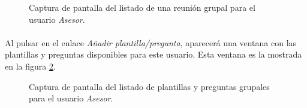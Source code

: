  \begin{figure}[!ht]
    \begin{center}
      \caption{Captura de pantalla del listado de una reunión grupal para el usuario \textit{Asesor}.}
      \label{capturaPantallaReunionGrupal}
    \end{center}
  \end{figure}

  \paragraph{}Al pulsar en el enlace \textit{Añadir plantilla/pregunta},
  aparecerá una ventana con las plantillas y preguntas disponibles para este
  usuario. Esta ventana es la mostrada en la figura
  \ref{capturaPantallaAddPlantillaReunionGru}.

  \begin{figure}[!ht]
    \begin{center}
      \caption{Captura de pantalla del listado de plantillas y preguntas grupales para el usuario \textit{Asesor}.}
      \label{capturaPantallaAddPlantillaReunionGru}
    \end{center}
  \end{figure}
